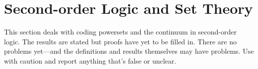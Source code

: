 \documentclass[../../../include/open-logic-chapter]{subfiles}
\begin{document}
\chapter{Second-order Logic and Set Theory}

\begin{editorial}
This section deals with coding powersets and the continuum in
second-order logic. The results are stated but proofs have yet to be
filled in. There are no problems yet---and the definitions and results
themselves may have problems. Use with caution and report anything
that's false or unclear.
\end{editorial}





\OLEndChapterHook
\end{document}
